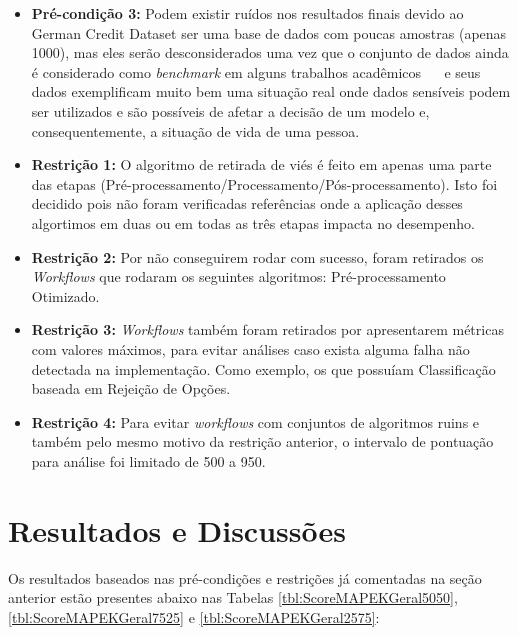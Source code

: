 \documentclass[portugues]{ic-tese}
\begin{document}
\begin{itemize}
\item \textbf{Pré-condição 3:} Podem existir ruídos nos resultados finais devido ao German Credit Dataset ser uma base de dados com poucas amostras (apenas 1000), mas eles serão desconsiderados uma vez que o conjunto de dados ainda é considerado como \textit{benchmark} em alguns trabalhos acadêmicos \citep{Kamiran_2011}~\citep{Feldman_2015}~\citep{Celis_2019} e seus dados exemplificam muito bem uma situação real onde dados sensíveis podem ser utilizados e são possíveis de afetar a decisão de um modelo e, consequentemente, a situação de vida de uma pessoa.

\item \textbf{Restrição 1:} O algoritmo de retirada de viés é feito em apenas uma parte das etapas (Pré-processamento/Processamento/Pós-processamento). Isto foi decidido pois não foram verificadas referências onde a aplicação desses algortimos em duas ou em todas as três etapas impacta no desempenho.

\item \textbf{Restrição 2:} Por não conseguirem rodar com sucesso, foram retirados os \textit{Workflows} que rodaram os seguintes algoritmos: Pré-processamento Otimizado.

\item \textbf{Restrição 3:} \textit{Workflows} também foram retirados por apresentarem métricas com valores máximos, para evitar análises caso exista alguma falha não detectada na implementação. Como exemplo, os que possuíam Classificação baseada em Rejeição de Opções.

\item \textbf{Restrição 4:} Para evitar \textit{workflows} com conjuntos de algoritmos ruins e também pelo mesmo motivo da restrição anterior, o intervalo de pontuação para análise foi limitado de 500 a 950.
\end{itemize}

\section{Resultados e Discussões}

Os resultados baseados nas pré-condições e restrições já comentadas na seção anterior estão presentes abaixo nas Tabelas \ref{tbl:ScoreMAPEKGeral5050}, \ref{tbl:ScoreMAPEKGeral7525} e \ref{tbl:ScoreMAPEKGeral2575}:
\end{document}
